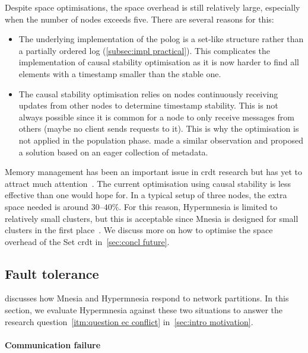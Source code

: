Despite space optimisations, the space overhead is still relatively large, especially 
when the number of nodes exceeds five. There are several reasons for this:

\begin{itemize}
  \item The underlying implementation of the \acrshort{polog} is a 
  set-like structure rather than a partially ordered 
  log (\cref{subsec:impl practical}). This complicates the implementation of
  causal stability optimisation as it is now harder to find all elements with
  a timestamp smaller than the stable one.
  \item The causal stability optimisation relies on nodes continuously receiving 
  updates from other nodes to determine timestamp stability. This is not always
  possible since it is common for a node to only receive messages from 
  others (maybe no client sends requests to it).
  This is why the optimisation is not applied in the
  population phase. \citet{bauwens2019crdtmemory} made a similar observation and 
  proposed a solution based on an eager collection of metadata.
\end{itemize}

Memory management has been an important issue in \acrshort{crdt} research but has
yet to attract much attention~\cite{bauwens2019crdtmemory}. The current optimisation
using causal stability is less effective than one would hope for. In a typical
setup of three nodes, the extra space needed is around \(30\)--\(40\%\). For
this reason, Hypermnesia is limited to relatively small clusters, but this is acceptable
since Mnesia is designed for small clusters in the first place~\cite{hebert2013LYSE}.
We discuss more on how to optimise the space overhead of the 
Set \acrshort{crdt} in~\cref{sec:concl future}.


\subsection{Fault tolerance} \label{sec:eval fault tolerance}

 discusses how Mnesia and Hypermnesia respond 
to network partitions. In this section, we evaluate Hypermnesia against these two 
situations to answer the research question~\cref{itm:question ec conflict} 
in~\cref{sec:intro motivation}.

\paragraph{Communication failure} \label{para:eval comm failure}

